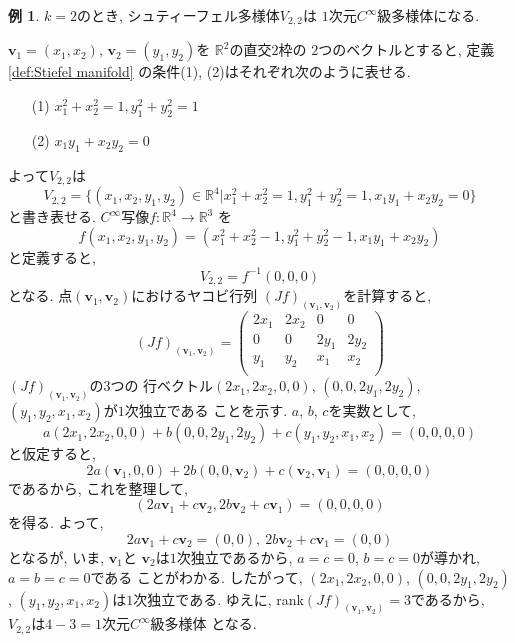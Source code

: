 \documentclass[a4j,12pt]{jarticle}
\theoremstyle{definition}
\newtheorem{example}[theorem]{例}
\begin{document}
\begin{example}\label{ex:(2,2)Stiefel manifold}
    $k=2$のとき, 
    シュティーフェル多様体$V_{2,2}$は
    $1$次元$C^\infty$級多様体になる. 

    $\boldsymbol{v}_1=(x_1,x_2)$, 
    $\boldsymbol{v}_2=(y_1,y_2)$を
    $\mathbb{R}^2$の直交$2$枠の
    $2$つのベクトルとすると, 定義\ref{def:Stiefel manifold}
    の条件(1), (2)はそれぞれ次のように表せる. 
    \begin{itemize}
        \item[(1)]
        $x_1^2+x_2^2=1, y_1^2+y_2^2=1$
        \item[(2)]
        $x_1y_1+x_2y_2=0$
    \end{itemize}
    よって$V_{2,2}$は
    $$V_{2,2}=\{(x_1,x_2,y_1,y_2)\in \mathbb{R}^4|
    x_1^2+x_2^2=1, y_1^2+y_2^2=1, x_1y_1+x_2y_2=0\}$$
    と書き表せる. 
    $C^\infty$写像$f:\mathbb{R}^4\to \mathbb{R}^3$
    を
    $$f(x_1,x_2,y_1,y_2)=
    (x_1^2+x_2^2-1, y_1^2+y_2^2-1, x_1y_1+x_2y_2)$$
    と定義すると, 
    $$V_{2,2}=f^{-1}(0,0,0)$$
    となる. 点$(\boldsymbol{v}_1,
    \boldsymbol{v}_2)$におけるヤコビ行列
    $(Jf)_{(\boldsymbol{v}_1,
    \boldsymbol{v}_2)}$を計算すると, 
    $$(Jf)_{(\boldsymbol{v}_1,
    \boldsymbol{v}_2)}=
    \left(\begin{array}{cccc}
        2x_1&2x_2&0&0\\
        0&0&2y_1&2y_2\\
        y_1&y_2&x_1&x_2\\
    \end{array}\right)$$
    $(Jf)_{(\boldsymbol{v}_1,
    \boldsymbol{v}_2)}$の$3$つの
    行ベクトル$(2x_1,2x_2,0,0)$, 
    $(0,0,2y_1,2y_2)$, 
    $(y_1,y_2,x_1,x_2)$が$1$次独立である
    ことを示す. $a$, $b$, $c$を実数として, 
    $$a(2x_1,2x_2,0,0)+b(0,0,2y_1,2y_2)+
    c(y_1,y_2,x_1,x_2)=(0,0,0,0)$$
    と仮定すると, 
    $$2a(\boldsymbol{v}_1,0,0)+
    2b(0,0,\boldsymbol{v}_2)+
    c(\boldsymbol{v}_2,\boldsymbol{v}_1)=
    (0,0,0,0)$$
    であるから, これを整理して, 
    $$(2a\boldsymbol{v}_1+c\boldsymbol{v}_2,
    2b\boldsymbol{v}_2+c\boldsymbol{v}_1)=
    (0,0,0,0)$$
    を得る. よって, 
    $$2a\boldsymbol{v}_1+c\boldsymbol{v}_2=
    (0,0),\ 
    2b\boldsymbol{v}_2+c\boldsymbol{v}_1=
    (0,0)$$
    となるが, いま, $\boldsymbol{v}_1$と
    $\boldsymbol{v}_2$は$1$次独立であるから, 
    $a=c=0$, $b=c=0$が導かれ, $a=b=c=0$である
    ことがわかる. したがって, $(2x_1,2x_2,0,0)$, 
    $(0,0,2y_1,2y_2)$, 
    $(y_1,y_2,x_1,x_2)$は$1$次独立である. 
    ゆえに, rank$(Jf)_{(\boldsymbol{v}_1,
    \boldsymbol{v}_2)}=3$であるから, 
    $V_{2,2}$は$4-3=1$次元$C^\infty$級多様体
    となる. 
\end{example}
\newpage
%
\end{document}
